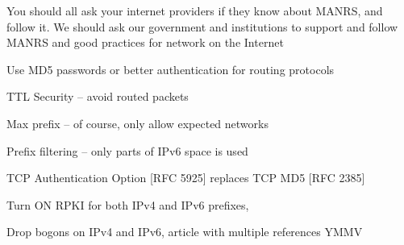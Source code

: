 \documentclass[Screen16to9,17pt]{foils}
\begin{document}
You should all ask your internet providers if they know about MANRS, and follow it. We should ask our government and institutions to support and follow MANRS and good practices for network on the Internet




\begin{list2}
\item Use MD5 passwords or better authentication for routing protocols {\myalert}
\item TTL Security -- avoid routed packets
\item Max prefix -- of course, only allow expected networks
\item Prefix filtering -- only parts of IPv6 space is used
\item TCP Authentication Option [RFC 5925] replaces TCP MD5 [RFC 2385]
\item Turn ON RPKI for both IPv4 and IPv6 prefixes, {\myalert} \\
\item Drop bogons on IPv4 and IPv6, article with multiple references YMMV\\
\end{list2}
\end{document}

